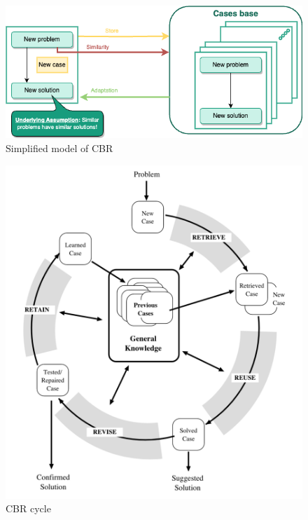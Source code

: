     \begin{figure}[h]
    \centering
    \includegraphics[width=\textwidth]{images/Concept-simplified-cbr-Simplified CBR princip.drawio.png}
    \caption{\label{fig:simple-cbr}  Simplified model of CBR \cite{probSolCBR}}
    \end{figure}
    
    \begin{figure}[h]
    \centering
    \includegraphics[scale=0.6]{images/Concept-cbr-cycle.png}
    \caption{\label{fig:cbr-cycle}  CBR cycle \cite{cbrIntroRecent}}
    \end{figure}
    

